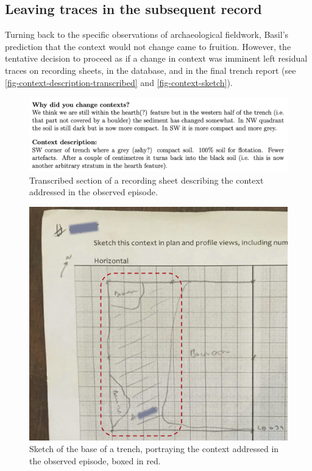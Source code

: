 \documentclass{article}
\begin{document}
\subsection{Leaving traces in the subsequent
record}\label{leaving-traces-in-the-subsequent-record}

Turning back to the specific observations of archaeological fieldwork,
Basil's prediction that the context would not change came to fruition.
However, the tentative decision to proceed as if a change in context was
imminent left residual traces on recording sheets, in the database, and
in the final trench report (see
\autoref{fig-context-description-transcribed} and
\autoref{fig-context-sketch}).

\begin{figure}
\centering
\includegraphics[width=6in]{../figures/context-description-transcribed.png}
\caption{Transcribed section of a recording sheet describing the context
addressed in the observed
episode.}\label{fig-context-description-transcribed}
\end{figure}

\begin{figure}
\centering
\includegraphics[width=6in]{../figures/context-sketch.png}
\caption{Sketch of the base of a trench, portraying the context
addressed in the observed episode, boxed in
red.}\label{fig-context-sketch}
\end{figure}
\end{document}
